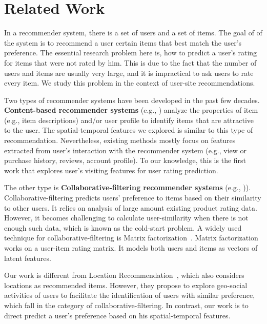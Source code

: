 
\section{Related Work}\label{sec:rw}

In a recommender system, there is a set of users and a set of items. The goal of of the system is to recommend a user certain items that best match the user's preference. The essential research problem here is, how to predict a user's rating for items that were not rated by him. This is due to the fact that the number of users and items are usually very large, and it is impractical to ask users to rate every item. We study this problem in the context of user-site recommendations.

Two types of recommender systems have been developed in the past few decades. \textbf{Content-based recommender systems} (e.g., \cite{contentbasedLang95,contentbasedPazzani97}) analyze the properties of item (e.g., item descriptions) and/or user profile to identify items that are attractive to the user. The spatial-temporal features we explored is similar to this type of recommendation. Nevertheless, existing methods mostly focus on features extracted from user's interaction with the recommender system (e.g., view or purchase history, reviews, account profile). To our knowledge, this is the first work that explores user's visiting features for user rating prediction. 

The other type is \textbf{Collaborative-filtering recommender systems} (e.g., \cite{userUserRec94,amazonRecommendation,MFRec09})). Collaborative-filtering predicts users' preference to items based on their similarity to other users. It relies on analysis of large amount existing product rating data. However, it becomes challenging to calculate user-similarity when there is not enough such data, which is known as the cold-start problem. A widely used technique for collaborative-filtering is Matrix factorization~\cite{koren2009matrix}. Matrix factorization works on a user-item rating matrix. It models both users and items as vectors of latent features.

Our work is different from Location Recommendation~\cite{ye2010location,wang2013location}, which also considers locations as recommended items. However, they propose to explore geo-social activities of users to facilitate the identification of users with similar preference, which fall in the category of collaborative-filtering. In contrast, our work is to direct predict a user's preference based on his spatial-temporal features.
